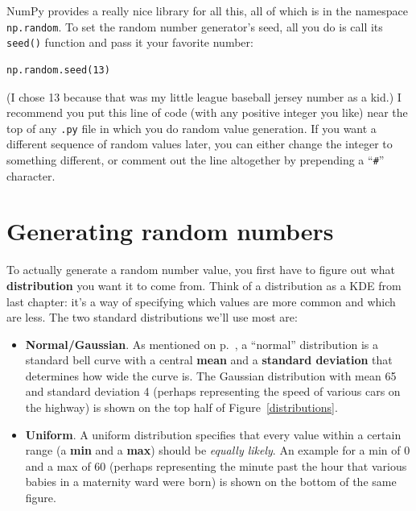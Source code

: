 
NumPy provides a really nice library for all this, all of which is in the
namespace \texttt{np.random}. To set the random number generator's seed, all
you do is call its \texttt{seed()} function and pass it your favorite number:

\begin{Verbatim}[fontsize=\small,samepage=true,frame=single,framesep=3mm]
np.random.seed(13)
\end{Verbatim}

(I chose 13 because that was my little league baseball jersey number as a
kid.) I recommend you put this line of code (with any positive integer you
like) near the top of any \texttt{.py} file in which you do random value
generation. If you want a different sequence of random values later, you can
either change the integer to something different, or comment out the line
altogether by prepending a ``\texttt{\#}'' character.

\section{Generating random numbers}


To actually generate a random number value, you first have to figure out what
\textbf{distribution} you want it to come from. Think of a distribution as a
KDE from last chapter: it's a way of specifying which values are more common
and which are less. The two standard distributions we'll use most are:

\label{GaussianDistro}

\begin{itemize}
\itemsep.1em
\item \textbf{Normal/Gaussian}. As mentioned on p.~\pageref{Gaussian}, a
``normal'' distribution is a standard bell curve with a central \textbf{mean}
and a \textbf{standard deviation} that determines how wide the curve is. The
Gaussian distribution with mean 65 and standard deviation 4 (perhaps
representing the speed of various cars on the highway) is shown on the top
half of Figure~\ref{distributions}.
\item \textbf{Uniform}. A uniform distribution specifies that every value
within a certain range (a \textbf{min} and a \textbf{max}) should be
\textit{equally likely}. An example for a min of 0 and a max of 60 (perhaps
representing the minute past the hour that various babies in a maternity ward
were born) is shown on the bottom of the same figure.
\end{itemize}

